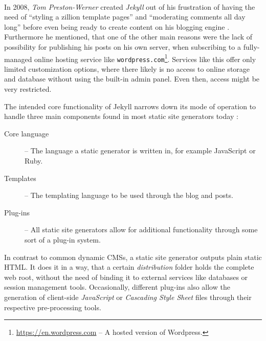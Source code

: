 \paragraph{} %
\label{par:creatingcontent}
In 2008, \emph{Tom Preston-Werner} created \emph{Jekyll} out of his frustration of having the need of ``styling a zillion template pages'' and ``moderating comments all day long'' before even being ready to create content on his blogging engine \cite[]{PrestonWerner2008jekyll}. Furthermore he mentioned, that one of the other main reasons were the lack of possibility for publishing his posts on his own server, when subscribing to a fully-managed online hosting service like \texttt{wordpress.com}\footnote{\url{https://en.wordpress.com} -- A hosted version of Wordpress.}. Services like this offer only limited customization options, where there likely is no access to online storage and database without using the built-in admin panel. Even then, access might be very restricted.

The intended core functionality of Jekyll narrows down its mode of operation to handle three main components found in most static site generators today \cite[24]{dhillon2016}:

\begin{description}
  \item [Core language] -- The language a static generator is written in, for example JavaScript or Ruby.
  \item [Templates] -- The templating language to be used through the blog and posts.
  \item [Plug-ins] -- All static site generators allow for additional functionality through some
sort of a plug-in system.
\end{description}

In contrast to common dynamic CMSs, a static site generator outputs plain static HTML. It does it in a way, that a certain \emph{distribution} folder holds the complete web root, without the need of binding it to external services like databases or session management tools. Occasionally, different plug-ins also allow the generation of client-side \emph{JavaScript} or \emph{Cascading Style Sheet} files through their respective pre-processing tools.





